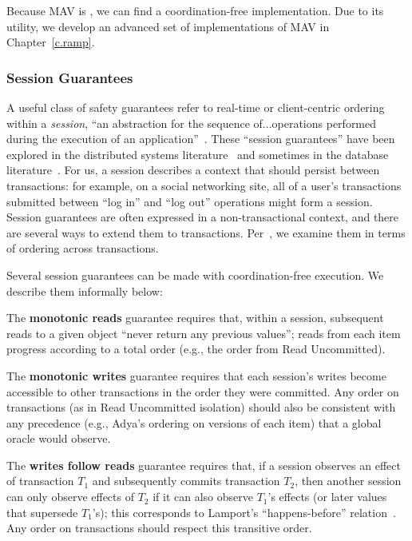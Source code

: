 Because MAV is \iconfluent, we can find a coordination-free
implementation. Due to its utility, we develop an advanced set of
implementations of MAV in Chapter~\ref{c.ramp}.


\subsubsection{Session Guarantees}

A useful class of safety guarantees refer to real-time or
client-centric ordering within a \textit{session}, ``an abstraction
for the sequence of...operations performed during the execution of an
application''~\cite{sessionguarantees}. These ``session guarantees''
have been explored in the distributed systems
literature~\cite{sessionguarantees,vogels-defs} and sometimes in the
database literature~\cite{daudjee-session}. For us, a session
describes a context that should persist between transactions: for
example, on a social networking site, all of a user's transactions
submitted between ``log in'' and ``log out'' operations might form a
session.  Session guarantees are often expressed in a
non-transactional context, and there are several ways to extend them
to transactions. Per~\cite{daudjee-session}, we examine them in terms
of ordering across transactions.

Several session guarantees can be made with coordination-free
execution. We describe them informally below:

\vspace{.5em}\noindent The \textbf{{monotonic reads}} guarantee requires that, within
a session, subsequent reads to a given object ``never return any
previous values''; reads from each item progress according to a total
order (e.g., the order from Read Uncommitted).

\vspace{.5em}\noindent The \textbf{{monotonic writes}} guarantee
requires that each session's writes become accessible to other
transactions in the order they were committed. Any order on
transactions (as in Read Uncommitted isolation) should also be
consistent with any precedence (e.g., Adya's ordering on versions of
each item) that a global oracle would observe.

\vspace{.5em}\noindent The \textbf{{writes follow reads}} guarantee requires that, if
a session observes an effect of transaction $T_1$ and subsequently
commits transaction $T_2$, then another session can only observe
effects of $T_2$ if it can also observe $T_1$'s effects (or later
values that supersede $T_1$'s); this corresponds to Lamport's
``happens-before'' relation~\cite{lamportclocks}.  Any order on
transactions should respect this transitive order.\vspace{.5em}

